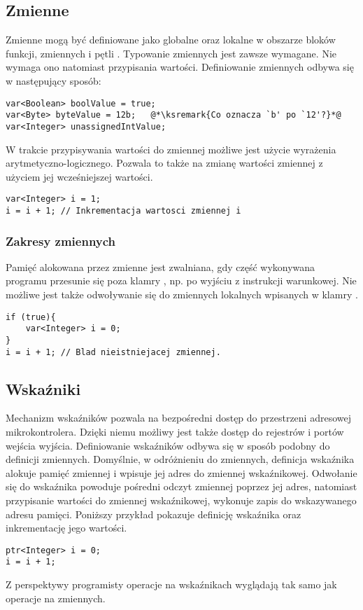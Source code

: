 \subsection{Zmienne}
Zmienne mogą być definiowane jako globalne oraz lokalne w obszarze bloków funkcji, zmiennych i pętli . Typowanie zmiennych jest zawsze wymagane. Nie wymaga ono natomiast przypisania wartości. Definiowanie zmiennych odbywa się w następujący sposób:
\begin{lstlisting}
var<Boolean> boolValue = true;
var<Byte> byteValue = 12b;   @*\ksremark{Co oznacza `b' po `12'?}*@
var<Integer> unassignedIntValue;
\end{lstlisting}
W trakcie przypisywania wartości do zmiennej możliwe jest użycie wyrażenia arytmetyczno-logicznego. Pozwala to także na zmianę wartości zmiennej z użyciem jej wcześniejszej wartości.
\begin{lstlisting}
var<Integer> i = 1;
i = i + 1; // Inkrementacja wartosci zmiennej i
\end{lstlisting}
\subsubsection{Zakresy zmiennych}
Pamięć alokowana przez zmienne jest zwalniana, gdy część wykonywana programu przesunie się poza klamry , np. po wyjściu z instrukcji warunkowej. Nie możliwe jest także odwoływanie się do zmiennych lokalnych wpisanych w klamry .
\begin{lstlisting}
if (true){
	var<Integer> i = 0;
}
i = i + 1; // Blad nieistniejacej zmiennej.
\end{lstlisting}
\subsection{Wskaźniki}
Mechanizm wskaźników pozwala na bezpośredni dostęp do przestrzeni adresowej mikrokontrolera. Dzięki niemu możliwy jest także dostęp do rejestrów i portów wejścia wyjścia.
Definiowanie wskaźników odbywa się w sposób podobny do definicji zmiennych. Domyślnie, w odróżnieniu do zmiennych, definicja wskaźnika alokuje pamięć zmiennej i wpisuje jej adres do zmiennej wskaźnikowej. Odwołanie się do wskaźnika powoduje pośredni odczyt zmiennej poprzez jej adres, natomiast przypisanie wartości do zmiennej wskaźnikowej, wykonuje zapis do wskazywanego adresu pamięci. Poniższy przykład pokazuje definicję wskaźnika oraz inkrementację jego wartości.
\begin{lstlisting}
ptr<Integer> i = 0;
i = i + 1;
\end{lstlisting}
Z perspektywy programisty operacje na wskaźnikach wyglądają tak samo jak operacje na zmiennych.

